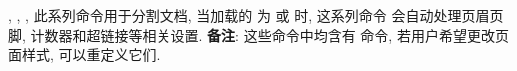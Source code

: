 \begin{function}[updated=2025-04-25]{\frontmatter, \mainmatter, \appmatter, \backmatter}
  此系列命令用于分割文档, 当加载的  为  或  时, 这系列命令
  会自动处理页眉页脚, 计数器和超链接等相关设置. \textbf{备注}: 这些命令中均含有 \cmd{\pagestyle}
  命令, 若用户希望更改页面样式, 可以重定义它们.
\end{function}
